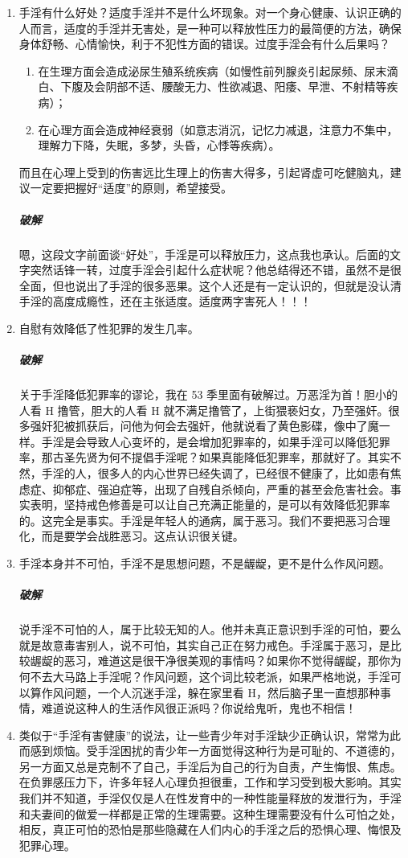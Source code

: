 \begin{enumerate}
    \item 手淫有什么好处？适度手淫并不是什么坏现象。对一个身心健康、认识正确的人而言，适度的手淫并无害处，是一种可以释放性压力的最简便的方法，确保身体舒畅、心情愉快，利于不犯性方面的错误。过度手淫会有什么后果吗？\begin{enumerate}
        \item 在生理方面会造成泌尿生殖系统疾病（如慢性前列腺炎引起尿频、尿末滴白、下腹及会阴部不适、腰酸无力、性欲减退、阳痿、早泄、不射精等疾病）；
        \item 在心理方面会造成神经衰弱（如意志消沉，记忆力减退，注意力不集中，理解力下降，失眠，多梦，头昏，心悸等疾病）。
    \end{enumerate}而且在心理上受到的伤害远比生理上的伤害大得多，引起肾虚可吃健脑丸，建议一定要把握好“适度”的原则，希望接受。
    \subparagraph{破解} 嗯，这段文字前面谈“好处”，手淫是可以释放压力，这点我也承认。后面的文字突然话锋一转，过度手淫会引起什么症状呢？他总结得还不错，虽然不是很全面，但也说出了手淫的很多恶果。这个人还是有一定认识的，但就是没认清手淫的高度成瘾性，还在主张适度。适度两字害死人！！！
    \item 自慰有效降低了性犯罪的发生几率。
    \subparagraph{破解} 关于手淫降低犯罪率的谬论，我在 53 季里面有破解过。万恶淫为首！胆小的人看 H 撸管，胆大的人看 H 就不满足撸管了，上街猥亵妇女，乃至强奸。很多强奸犯被抓获后，问他为何会去强奸，他就说看了黄色影碟，像中了魔一样。手淫是会导致人心变坏的，是会增加犯罪率的，如果手淫可以降低犯罪率，那古圣先贤为何不提倡手淫呢？如果真能降低犯罪率，那就好了。其实不然，手淫的人，很多人的内心世界已经失调了，已经很不健康了，比如患有焦虑症、抑郁症、强迫症等，出现了自残自杀倾向，严重的甚至会危害社会。事实表明，坚持戒色修善是可以让自己充满正能量的，是可以有效降低犯罪率的。这完全是事实。手淫是年轻人的通病，属于恶习。我们不要把恶习合理化，而是要学会战胜恶习。这点认识很关键。
    \item 手淫本身并不可怕，手淫不是思想问题，不是龌龊，更不是什么作风问题。
    \subparagraph{破解} 说手淫不可怕的人，属于比较无知的人。他并未真正意识到手淫的可怕，要么就是故意毒害别人，说不可怕，其实自己正在努力戒色。手淫属于恶习，是比较龌龊的恶习，难道这是很干净很美观的事情吗？如果你不觉得龌龊，那你为何不去大马路上手淫呢？作风问题，这个词比较老派，如果严格地说，手淫可以算作风问题，一个人沉迷手淫，躲在家里看 H，然后脑子里一直想那种事情，难道说这种人的生活作风很正派吗？你说给鬼听，鬼也不相信！
    \item 类似于“手淫有害健康”的说法，让一些青少年对手淫缺少正确认识，常常为此而感到烦恼。受手淫困扰的青少年一方面觉得这种行为是可耻的、不道德的，另一方面又总是克制不了自己，手淫后为自己的行为自责，产生悔恨、焦虑。在负罪感压力下，许多年轻人心理负担很重，工作和学习受到极大影响。其实我们并不知道，手淫仅仅是人在性发育中的一种性能量释放的发泄行为，手淫和夫妻间的做爱一样都是正常的生理需要。这种生理需要没有什么可怕之处，相反，真正可怕的恐怕是那些隐藏在人们内心的手淫之后的恐惧心理、悔恨及犯罪心理。

\end{enumerate}
